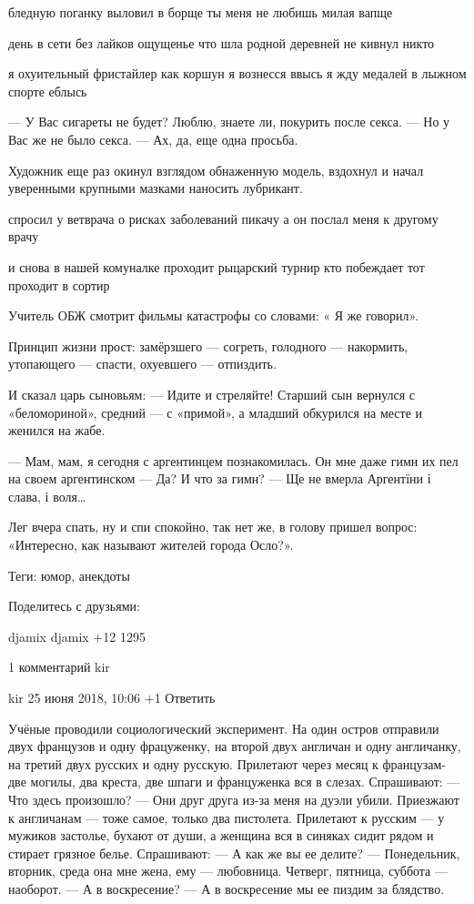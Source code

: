 бледную поганку
выловил в борще
ты меня не любишь
милая вапще

день в сети без лайков
ощущенье что
шла родной деревней
не кивнул никто

я охуительный фристайлер
как коршун я вознесся ввысь
я жду медалей в лыжном спорте
еблысь

— У Вас сигареты не будет? Люблю, знаете ли, покурить после секса.
— Но у Вас же не было секса.
— Ах, да, еще одна просьба.

Художник еще раз окинул взглядом обнаженную модель, вздохнул и начал уверенными крупными мазками наносить лубрикант.

спросил у ветврача о рисках
заболеваний пикачу
а он послал меня к другому
врачу

и снова в нашей комуналке
проходит рыцарский турнир
кто побеждает тот проходит
в сортир

Учитель ОБЖ смотрит фильмы катастрофы со словами: « Я же говорил».

Принцип жизни прост:
замёрзшего — согреть, голодного — накормить, утопающего — спасти, охуевшего — отпиздить.

И сказал царь сыновьям:
— Идите и стреляйте!
Старший сын вернулся с «беломориной», средний — с «примой», а младший обкурился на месте и женился на жабе.

— Мам, мам, я сегодня с аргентинцем познакомилась. Он мне даже гимн их пел на своем аргентинском
— Да? И что за гимн?
— Ще не вмерла Аргентїни і слава, і воля…

Лег вчера спать, ну и спи спокойно, так нет же, в голову пришел вопрос: «Интересно, как называют жителей города Осло?».

    Теги: юмор, анекдоты	

Поделитесь с друзьями:

    djamix djamix
    +12
    1295 

1 комментарий
kir

    kir
    25 июня 2018, 10:06
    +1
    Ответить

Учёные проводили социологический эксперимент.
На один остров отправили двух французов и одну
фрацуженку, на второй двух англичан и одну англичанку,
на третий двух русских и одну русскую. Прилетают
через месяц к французам- две могилы, два креста,
две шпаги и француженка вся в слезах. Спрашивают:
— Что здесь произошло?
— Они друг друга из-за меня на дуэли убили.
Приезжают к англичанам — тоже самое, только два пистолета.
Прилетают к русским — у мужиков застолье, бухают от души,
а женщина вся в синяках сидит рядом и стирает грязное белье.
Спрашивают:
— А как же вы ее делите?
— Понедельник, вторник, среда она мне жена, ему —
любовница. Четверг, пятница, суббота — наоборот.
— А в воскресение?
— А в воскресение мы ее пиздим за блядство.

